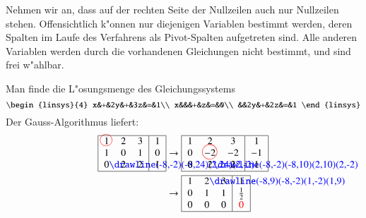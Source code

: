 Nehmen wir an, dass auf der rechten Seite der Nullzeilen auch
nur Nullzeilen stehen.
Offensichtlich k"onnen nur diejenigen Variablen bestimmt werden,
deren Spalten im Laufe des Verfahrens als Pivot-Spalten aufgetreten sind.
Alle anderen Variablen werden durch die vorhandenen Gleichungen nicht
bestimmt, und sind frei w"ahlbar.

\begin{beispiel}
Man finde die L"osungsmenge des Gleichungssystems
\[
\begin{linsys}{4}
x&+&2y&+&3z&=&1\\
x&&&+&z&=&0\\
 &&2y&+&2z&=&1
\end{linsys}
\]
Der Gauss-Algorithmus liefert:
\begin{align*}
\begin{tabular}{|>{$}c<{$}>{$}c<{$}>{$}c<{$}|>{$}c<{$}|}
\hline
1%
\begin{picture}(0,0)
\color{red}\put(-3,4){\circle{12}}
\end{picture}%
&2&3&1\\
1&0&1&0\\
0%
\begin{picture}(0,0)
\color{blue}\drawline(-8,-2)(-8,24)(2,24)(2,-2)
\end{picture}%
&2&2&1\\
\hline
\end{tabular}
&\rightarrow
\begin{tabular}{|>{$}c<{$}>{$}c<{$}>{$}c<{$}|>{$}c<{$}|}
\hline
1&2&3&1\\
0&-2%
\begin{picture}(0,0)
\color{red}\put(-6,4){\circle{15}}
\end{picture}%
&-2&-1\\
0&2%
\begin{picture}(0,0)
\color{blue}\drawline(-8,-2)(-8,10)(2,10)(2,-2)
\end{picture}%
&2&1\\
\hline
\end{tabular}
\\
&\rightarrow
\begin{tabular}{|>{$}c<{$}>{$}c<{$}>{$}c<{$}|>{$}c<{$}|}
\hline
1&2%
\begin{picture}(0,0)
\color{blue}\drawline(-8,9)(-8,-2)(1,-2)(1,9)
\end{picture}%
&3&1\\
0&1&1&\frac12\\
0&0&0&\color{red}0\\
\hline
\end{tabular}

\end{align*}
\end{beispiel}
